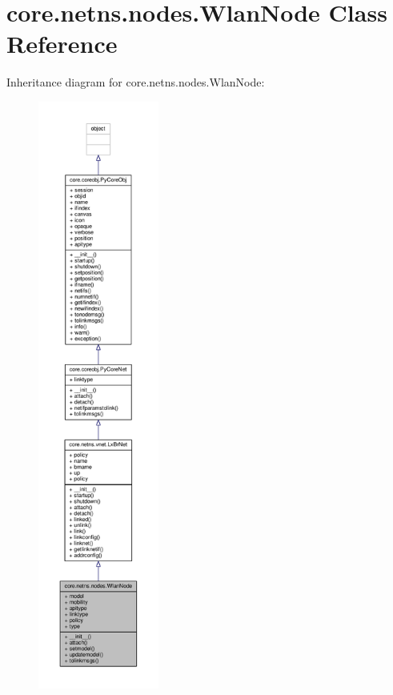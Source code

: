 \hypertarget{classcore_1_1netns_1_1nodes_1_1_wlan_node}{\section{core.\+netns.\+nodes.\+Wlan\+Node Class Reference}
\label{classcore_1_1netns_1_1nodes_1_1_wlan_node}
}


Inheritance diagram for core.\+netns.\+nodes.\+Wlan\+Node\+:
\nopagebreak
\begin{figure}[H]
\begin{center}
\leavevmode
\includegraphics[height=550pt]{classcore_1_1netns_1_1nodes_1_1_wlan_node__inherit__graph}
\end{center}
\end{figure}


